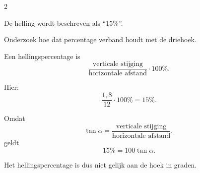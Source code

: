 \documentclass{ximera}
\begin{document}
\begin{oefening}{\oefU\ESS}
\begin{multicols}{2}
    
    \begin{question}
    De helling wordt beschreven als ``$15\%$''.
    
    Onderzoek hoe dat percentage verband houdt met de driehoek.
    
    \begin{oplossing}
    Een hellingspercentage is
    \[
    \frac{\text{verticale stijging}}
    {\text{horizontale afstand}}
    \cdot100\%.
    \]
    
    Hier:
    \[
    \frac{1{,}8}{12}\cdot100\%
    =15\%.
    \]
    
    Omdat
    \[
    \tan\alpha
    =\frac{\text{verticale stijging}}
    {\text{horizontale afstand}},
    \]
    geldt
    \[
    15\%=100\tan\alpha.
    \]
    
    Het hellingspercentage is dus niet gelijk aan de hoek in graden.
    \end{oplossing}
    \end{question}
    
    \end{multicols}
    
    \end{oefening}
    
    
    
\end{document}
